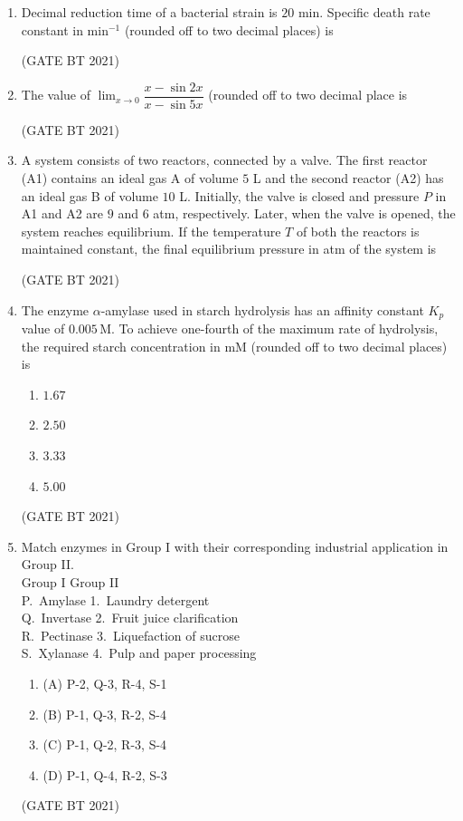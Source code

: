 \documentclass[journal,12pt,onecolumn]{IEEEtran}
\theoremstyle{remark}
\begin{document}
\begin{enumerate}
\item Decimal reduction time of a bacterial strain is $20$ min. Specific death rate constant in min$^{-1}$ (rounded off to two decimal places) is

\hfill (GATE BT 2021)

\item The value of $\lim_{x\to 0}\dfrac{x-\sin 2x}{x-\sin 5x}$ (rounded off to two decimal place is

\hfill (GATE BT 2021)

\item A system consists of two reactors, connected by a valve. The first reactor (A1) contains an ideal gas A of volume $5$ L and the second reactor (A2) has an ideal gas B of volume $10$ L. Initially, the valve is closed and pressure $P$ in A1 and A2 are $9$ and $6$ atm, respectively. Later, when the valve is opened, the system reaches equilibrium. If the temperature $T$ of both the reactors is maintained constant, the final equilibrium pressure in atm of the system is

\hfill (GATE BT 2021)

\item The enzyme $\alpha$-amylase used in starch hydrolysis has an affinity constant $K_p$ value of $0.005 \,\text{M}$. To achieve one-fourth of the maximum rate of hydrolysis, the required starch concentration in mM (rounded off to two decimal places) is
\begin{enumerate}
\item $1.67$
\item $2.50$
\item $3.33$
\item $5.00$
\end{enumerate}
\hfill (GATE BT 2021)

\item Match enzymes in Group I with their corresponding industrial application in Group II.\\[2pt]
Group I \hspace{3cm} Group II\\
P.\ Amylase \hspace{2.6cm} 1.\ Laundry detergent\\
Q.\ Invertase \hspace{2.5cm} 2.\ Fruit juice clarification\\
R.\ Pectinase \hspace{2.5cm} 3.\ Liquefaction of sucrose\\
S.\ Xylanase \hspace{2.55cm} 4.\ Pulp and paper processing
\begin{enumerate}
\item (A) P-2, Q-3, R-4, S-1
\item (B) P-1, Q-3, R-2, S-4
\item (C) P-1, Q-2, R-3, S-4
\item (D) P-1, Q-4, R-2, S-3
\end{enumerate}
\hfill (GATE BT 2021)


\end{enumerate}
\end{document}

